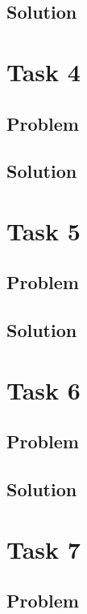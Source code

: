 \documentclass[a4paper, 10pt]{article}
\begin{document}
		\subsection{Solution}
	
	\section{Task 4}
	
		\subsection{Problem}
		
		\subsection{Solution}
	
	\section{Task 5}
	
		\subsection{Problem}
		
		\subsection{Solution}
	
	\section{Task 6}
	
		\subsection{Problem}
		
		\subsection{Solution}
	
	\section{Task 7}
	
		\subsection{Problem}
		
\end{document}
